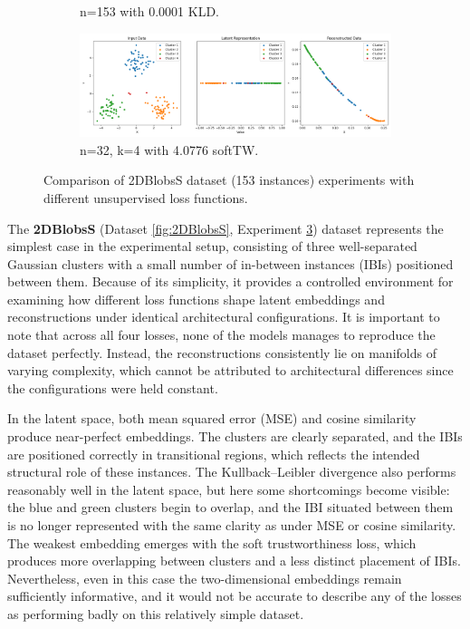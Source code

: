 \begin{figure}[htbp]
\begin{subfigure}[b]{1.0\textwidth}
    \caption{n=153 with 0.0001 KLD.}
    \label{fig:RQ2/kld/2DBlobsS}
  \end{subfigure}
  \hfill
  \begin{subfigure}[b]{1.0\textwidth}
    \centering
    \includegraphics[width=\linewidth]{images/RQ2/tru/2DBlobsS_32n_4k_4.0776.png}
    \caption{n=32, k=4 with 4.0776 softTW.}
    \label{fig:RQ2/tru/2DBlobsS}
  \end{subfigure}

  \caption{Comparison of 2DBlobsS dataset (153 instances) experiments with different unsupervised loss functions.}
  \label{fig:RQ2/2DBlobsS}
\end{figure}

The \textbf{2DBlobsS} (Dataset \ref{fig:2DBlobsS}, Experiment \ref{fig:RQ2/2DBlobsS}) dataset represents the simplest case in the experimental setup, consisting of three well-separated Gaussian clusters with a small number of in-between instances (IBIs) positioned between them. Because of its simplicity, it provides a controlled environment for examining how different loss functions shape latent embeddings and reconstructions under identical architectural configurations. It is important to note that across all four losses, none of the models manages to reproduce the dataset perfectly. Instead, the reconstructions consistently lie on manifolds of varying complexity, which cannot be attributed to architectural differences since the configurations were held constant.

In the latent space, both mean squared error (MSE) and cosine similarity produce near-perfect embeddings. The clusters are clearly separated, and the IBIs are positioned correctly in transitional regions, which reflects the intended structural role of these instances. The Kullback–Leibler divergence also performs reasonably well in the latent space, but here some shortcomings become visible: the blue and green clusters begin to overlap, and the IBI situated between them is no longer represented with the same clarity as under MSE or cosine similarity. The weakest embedding emerges with the soft trustworthiness loss, which produces more overlapping between clusters and a less distinct placement of IBIs. Nevertheless, even in this case the two-dimensional embeddings remain sufficiently informative, and it would not be accurate to describe any of the losses as performing badly on this relatively simple dataset.

